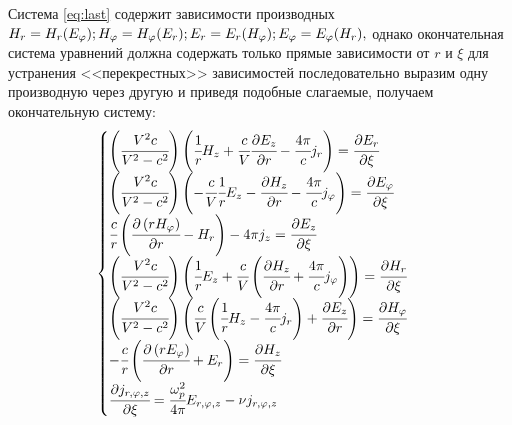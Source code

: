 \documentclass[a4paper]{article}
\begin{document}
Система \eqref{eq:last} содержит зависимости производных $H_{r}=H_{r}(E_{\varphi}); H_{\varphi}=H_{\varphi}(E_{r});\\E_{r}=E_{r}(H_{\varphi});E_{\varphi}=E_{\varphi}(H_{r}), $ однако окончательная система уравнений должна содержать только прямые зависимости от $r$ и $\xi$ для устранения <<перекрестных>> зависимостей последовательно выразим одну производную через другую и приведя подобные слагаемые, получаем окончательную систему:
\begin{equation}
	\begin{cases}
		\left(\cfrac{V^{2}c}{V^{2}-c^{2}}\right)\left(\cfrac{1}{r}H_{z}+\cfrac{c}{V}\cfrac{\partial E_{z}}{\partial r}-\cfrac{4\pi}{c}j_{r}\right)=\cfrac{\partial E_{r}}{\partial\xi}\\
		
		\left(\cfrac{V^{2}c}{V^{2}-c^{2}}\right)\left(-\cfrac{c}{V}\cfrac{1}{r}E_{z}-\cfrac{\partial H_{z}}{\partial r}-\cfrac{4\pi}{c}j_{\varphi}\right)=\cfrac{\partial E_{\varphi}}{\partial\xi}\\		
		
		\cfrac{c}{r}\left(\cfrac{\partial\left(r H_{\varphi}\right)}{\partial r}-H_{r}\right)-{4\pi}j_{z}=\cfrac{\partial E_{z}}{\partial\xi}\\
		
		\left(\cfrac{V^{2}c}{V^{2}-c^{2}}\right)\left(\cfrac{1}{r}E_{z}+\cfrac{c}{V}\left(\cfrac{\partial H_{z}}{\partial r}+\cfrac{4\pi}{c}j_{\varphi}\right)\right)=\cfrac{\partial H_{r}}{\partial\xi}\\
		
		\left(\cfrac{V^{2}c}{V^{2}-c^{2}}\right)\left(\cfrac{c}{V}\left(\cfrac{1}{r}H_{z}-\cfrac{4\pi}{c}j_{r}\right)+\cfrac{\partial E_{z}}{\partial r}\right)=\cfrac{\partial H_{\varphi}}{\partial\xi}\\
		
		-\cfrac{c}{r}\left(\cfrac{\partial\left(r E_{\varphi}\right)}{\partial r}+E_{r}\right)=\cfrac{\partial H_{z}}{\partial\xi}\\
		
		\cfrac{\partial j_{r,\varphi,z}}{\partial\xi}=\cfrac{\omega_{p}^{2}}{4\pi}E_{r,\varphi,z}-\nu j_{r,\varphi,z}
	\end{cases}		
	\label{eq:superlast}
\end{equation}
\end{document}
